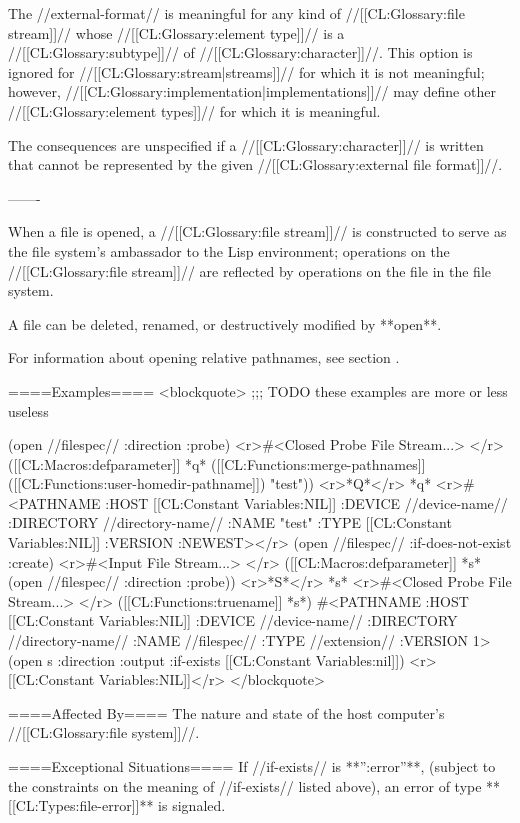The //external-format// is meaningful for any kind of //[[CL:Glossary:file stream]]// whose //[[CL:Glossary:element type]]// is a //[[CL:Glossary:subtype]]// of //[[CL:Glossary:character]]//. This option is ignored for //[[CL:Glossary:stream|streams]]// for which it is not meaningful; however, //[[CL:Glossary:implementation|implementations]]// may define other //[[CL:Glossary:element types]]// for which it is meaningful.

The consequences are unspecified if a //[[CL:Glossary:character]]// is written that cannot be represented by the given //[[CL:Glossary:external file format]]//.

-------

When a file is opened, a //[[CL:Glossary:file stream]]// is constructed to serve as the file system's ambassador to the Lisp environment; operations on the //[[CL:Glossary:file stream]]// are reflected by operations on the file in the file system.

A file can be deleted, renamed, or destructively modified by **open**.

For information about opening relative pathnames, see section {\secref\MergingPathnames}.

====Examples====
<blockquote>
;;; TODO these examples are more or less useless

(open //filespec// :direction :probe) <r>#<Closed Probe File Stream...> </r>
([[CL:Macros:defparameter]] *q* ([[CL:Functions:merge-pathnames]] ([[CL:Functions:user-homedir-pathname]]) "test")) <r>*Q*</r>
*q*
<r>#<PATHNAME :HOST [[CL:Constant Variables:NIL]] :DEVICE //device-name// :DIRECTORY //directory-name// 
           :NAME "test" :TYPE [[CL:Constant Variables:NIL]] :VERSION :NEWEST></r>
(open //filespec// :if-does-not-exist :create) <r>#<Input File Stream...> </r>
([[CL:Macros:defparameter]] *s* (open //filespec// :direction :probe)) <r>*S*</r>
*s* <r>#<Closed Probe File Stream...> </r>
([[CL:Functions:truename]] *s*) 
#<PATHNAME :HOST [[CL:Constant Variables:NIL]] :DEVICE //device-name// :DIRECTORY //directory-name// 
           :NAME //filespec// :TYPE //extension// :VERSION 1>
(open s :direction :output :if-exists [[CL:Constant Variables:nil]]) <r>[[CL:Constant Variables:NIL]]</r>
</blockquote>

====Affected By====
The nature and state of the host computer's //[[CL:Glossary:file system]]//.

====Exceptional Situations====
If //if-exists// is **'':error''**, (subject to the constraints on the meaning of //if-exists// listed above), an error of type **[[CL:Types:file-error]]** is signaled.

